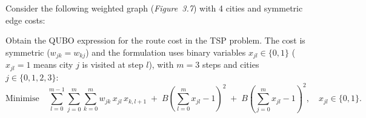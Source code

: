 \documentclass{ceri/sty/rapport}
\newcounter{exercice}[section]
\begin{document}
\begin{exercice}[p.~121]
Consider the following weighted graph (\emph{Figure~3.7}) with 4 cities and symmetric edge costs:

\medskip
\begin{center}
\end{center}

\medskip
Obtain the QUBO expression for the route cost in the TSP problem.
The cost is symmetric ($w_{jk} = w_{kj}$) and the formulation uses binary variables
$x_{jl} \in \{0,1\}$ ($x_{jl}=1$ means city $j$ is visited at step $l$), with $m = 3$ steps
and cities $j \in \{0,1,2,3\}$:
\[
  \text{Minimise}\quad
  \sum_{l=0}^{m-1}\sum_{j=0}^{m}\sum_{k=0}^{m} w_{jk}\,x_{jl}\,x_{k,l+1}
  \;+\; B\!\left(\sum_{l=0}^{m} x_{jl} - 1\right)^{\!2}
  \;+\; B\!\left(\sum_{j=0}^{m} x_{jl} - 1\right)^{\!2},
  \quad x_{jl}\in\{0,1\}.
\]
\end{exercice}
\end{document}
